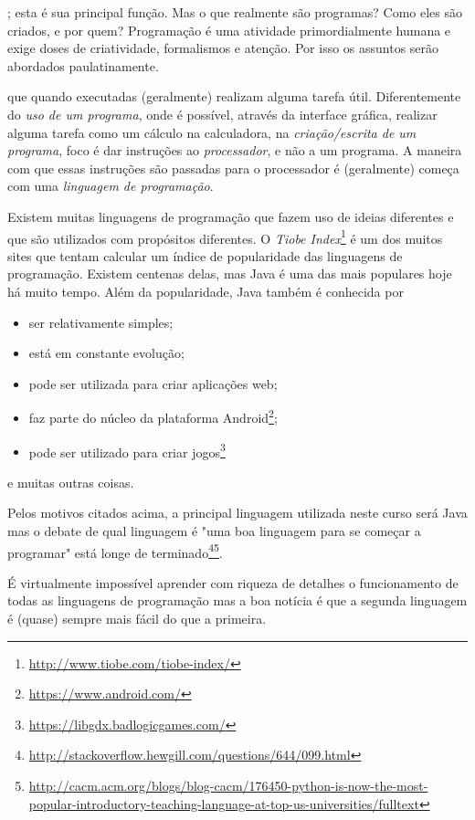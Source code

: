 \documentclass[justified]{tufte-handout}
\begin{document}
; esta é sua principal função. Mas o que realmente são programas? Como eles são criados, e por quem? Programação é uma atividade primordialmente humana e exige doses de criatividade, formalismos e atenção. Por isso os assuntos serão abordados paulatinamente.

 que quando executadas (geralmente) realizam alguma tarefa útil. Diferentemente do \emph{uso de um programa}, onde é possível, através da interface gráfica, realizar alguma tarefa como um cálculo na calculadora, na \emph{criação/escrita de um programa}, foco é dar instruções ao \emph{processador}, e não a um programa. A maneira com que essas instruções são passadas para o processador é (geralmente) começa com uma \emph{linguagem de programação}.

Existem muitas linguagens de programação que fazem uso de ideias diferentes e que são utilizados com propósitos diferentes. O \emph{Tiobe Index}\footnote{\url{http://www.tiobe.com/tiobe-index/}} é um dos muitos sites que tentam calcular um índice de popularidade das linguagens de programação. Existem centenas delas, mas Java é uma das mais populares hoje há muito tempo. Além da popularidade, Java também é conhecida por
\begin{itemize}
	\item ser relativamente simples;
	\item está em constante evolução;
	\item pode ser utilizada para criar aplicações web;
	\item faz parte do núcleo da plataforma Android\footnote{\url{https://www.android.com/}};
	\item pode ser utilizado para criar jogos\footnote{\url{https://libgdx.badlogicgames.com/}}
\end{itemize}
e muitas outras coisas.

Pelos motivos citados acima, a principal linguagem utilizada neste curso será Java mas o debate de qual linguagem é "uma boa linguagem para se começar a programar" está longe de terminado\footnote{\url{http://stackoverflow.hewgill.com/questions/644/099.html}}\footnote{\url{http://cacm.acm.org/blogs/blog-cacm/176450-python-is-now-the-most-popular-introductory-teaching-language-at-top-us-universities/fulltext}}.

É virtualmente impossível aprender com riqueza de detalhes o funcionamento de todas as linguagens de programação mas a boa notícia é que a segunda linguagem é (quase) sempre mais fácil do que a primeira.
\end{document}
